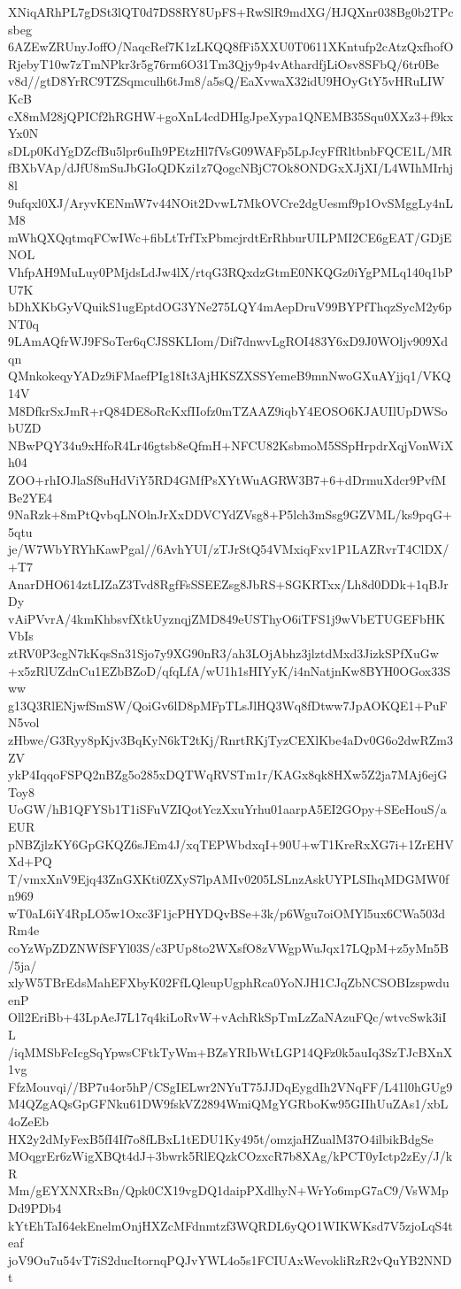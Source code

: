 XNiqARhPL7gDSt3lQT0d7DS8RY8UpFS+RwSlR9mdXG/HJQXnr038Bg0b2TPcsbeg
6AZEwZRUnyJoffO/NaqcRef7K1zLKQQ8fFi5XXU0T0611XKntufp2cAtzQxfhofO
RjebyT10w7zTmNPkr3r5g76rm6O31Tm3Qjy9p4vAthardfjLiOsv8SFbQ/6tr0Be
v8d//gtD8YrRC9TZSqmculh6tJm8/a5sQ/EaXvwaX32idU9HOyGtY5vHRuLIWKcB
cX8mM28jQPICf2hRGHW+goXnL4cdDHIgJpeXypa1QNEMB35Squ0XXz3+f9kxYx0N
sDLp0KdYgDZcfBu5lpr6uIh9PEtzHl7fVsG09WAFp5LpJcyFfRltbnbFQCE1L/MR
fBXbVAp/dJfU8mSuJbGIoQDKzi1z7QogcNBjC7Ok8ONDGxXJjXI/L4WIhMIrhj8l
9ufqxl0XJ/AryvKENmW7v44NOit2DvwL7MkOVCre2dgUesmf9p1OvSMggLy4nLM8
mWhQXQqtmqFCwIWc+fibLtTrfTxPbmcjrdtErRhburUILPMI2CE6gEAT/GDjENOL
VhfpAH9MuLuy0PMjdsLdJw4lX/rtqG3RQxdzGtmE0NKQGz0iYgPMLq140q1bPU7K
bDhXKbGyVQuikS1ugEptdOG3YNe275LQY4mAepDruV99BYPfThqzSycM2y6pNT0q
9LAmAQfrWJ9FSoTer6qCJSSKLIom/Dif7dnwvLgROI483Y6xD9J0WOljv909Xdqn
QMnkokeqyYADz9iFMaefPIg18It3AjHKSZXSSYemeB9mnNwoGXuAYjjq1/VKQ14V
M8DfkrSxJmR+rQ84DE8oRcKxfIIofz0mTZAAZ9iqbY4EOSO6KJAUIlUpDWSobUZD
NBwPQY34u9xHfoR4Lr46gtsb8eQfmH+NFCU82KsbmoM5SSpHrpdrXqjVonWiXh04
ZOO+rhIOJlaSf8uHdViY5RD4GMfPsXYtWuAGRW3B7+6+dDrmuXdcr9PvfMBe2YE4
9NaRzk+8mPtQvbqLNOlnJrXxDDVCYdZVsg8+P5lch3mSsg9GZVML/ks9pqG+5qtu
je/W7WbYRYhKawPgal//6AvhYUI/zTJrStQ54VMxiqFxv1P1LAZRvrT4ClDX/+T7
AnarDHO614ztLIZaZ3Tvd8RgfFsSSEEZsg8JbRS+SGKRTxx/Lh8d0DDk+1qBJrDy
vAiPVvrA/4kmKhbsvfXtkUyznqjZMD849eUSThyO6iTFS1j9wVbETUGEFbHKVbIs
ztRV0P3cgN7kKqsSn31Sjo7y9XG90nR3/ah3LOjAbhz3jlztdMxd3JizkSPfXuGw
+x5zRlUZdnCu1EZbBZoD/qfqLfA/wU1h1sHIYyK/i4nNatjnKw8BYH0OGox33Sww
g13Q3RlENjwfSmSW/QoiGv6lD8pMFpTLsJlHQ3Wq8fDtww7JpAOKQE1+PuFN5vol
zHbwe/G3Ryy8pKjv3BqKyN6kT2tKj/RnrtRKjTyzCEXlKbe4aDv0G6o2dwRZm3ZV
ykP4IqqoFSPQ2nBZg5o285xDQTWqRVSTm1r/KAGx8qk8HXw5Z2ja7MAj6ejGToy8
UoGW/hB1QFYSb1T1iSFuVZIQotYczXxuYrhu01aarpA5EI2GOpy+SEeHouS/aEUR
pNBZjlzKY6GpGKQZ6sJEm4J/xqTEPWbdxqI+90U+wT1KreRxXG7i+1ZrEHVXd+PQ
T/vmxXnV9Ejq43ZnGXKti0ZXyS7lpAMIv0205LSLnzAskUYPLSIhqMDGMW0fn969
wT0aL6iY4RpLO5w1Oxc3F1jcPHYDQvBSe+3k/p6Wgu7oiOMYl5ux6CWa503dRm4e
coYzWpZDZNWfSFYl03S/c3PUp8to2WXsfO8zVWgpWuJqx17LQpM+z5yMn5B/5ja/
xlyW5TBrEdsMahEFXbyK02FfLQleupUgphRca0YoNJH1CJqZbNCSOBIzspwduenP
Oll2EriBb+43LpAeJ7L17q4kiLoRvW+vAchRkSpTmLzZaNAzuFQc/wtvcSwk3iIL
/iqMMSbFcIcgSqYpwsCFtkTyWm+BZsYRIbWtLGP14QFz0k5auIq3SzTJcBXnX1vg
FfzMouvqi//BP7u4or5hP/CSgIELwr2NYuT75JJDqEygdIh2VNqFF/L41l0hGUg9
M4QZgAQsGpGFNku61DW9fskVZ2894WmiQMgYGRboKw95GIIhUuZAs1/xbL4oZeEb
HX2y2dMyFexB5fI4If7o8fLBxL1tEDU1Ky495t/omzjaHZualM37O4ilbikBdgSe
MOqgrEr6zWigXBQt4dJ+3bwrk5RlEQzkCOzxcR7b8XAg/kPCT0yIctp2zEy/J/kR
Mm/gEYXNXRxBn/Qpk0CX19vgDQ1daipPXdlhyN+WrYo6mpG7aC9/VsWMpDd9PDb4
kYtEhTaI64ekEnelmOnjHXZcMFdnmtzf3WQRDL6yQO1WIKWKsd7V5zjoLqS4teaf
joV9Ou7u54vT7iS2ducItornqPQJvYWL4o5s1FCIUAxWevokliRzR2vQuYB2NNDt

